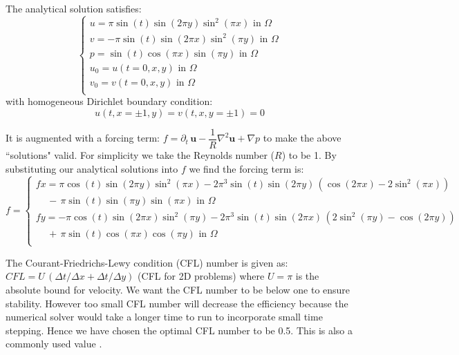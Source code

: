 The analytical solution satisfies:
\begin{equation}
\begin{cases}
u = \pi\sin(t)\sin(2\pi y)\sin^2(\pi x) \text{   in $\Omega$} \\
v = - \pi \sin(t)\sin(2\pi x)\sin^2(\pi y) \text{   in $\Omega$} \\
p = \sin(t)\cos(\pi x)\sin(\pi y)  \text{   in $\Omega$}  \\
u_0 = u(t=0,x,y)  \text{   in $\Omega$}  \\
v_0 = v(t=0,x,y)  \text{   in $\Omega$}  \\
\end{cases}
\end{equation}
with homogeneous Dirichlet boundary condition:
\begin{equation*}
u(t, x=\pm 1, y) = v(t, x,y= \pm 1) = 0
\end{equation*}

It is augmented with a forcing term: $f = \partial_t\,\textbf{u} - \dfrac{1}{R}\nabla^2 \textbf{u} + \nabla p$ to make the above ``solutions" valid. For simplicity we take the Reynolds number ($R$) to be 1. By substituting our analytical solutions into $f$ we find the forcing term is:
\begin{equation}
f = 
\begin{cases}
fx = \pi\cos(t)\sin(2\pi y)\sin^2(\pi x) -  2 \pi^3\sin(t)\sin(2\pi y)\,(\cos(2\pi x) - 2\sin^2(\pi x)) \\
\,\,\,\,\,\,\,- \, \pi\sin(t)\sin(\pi y)\sin(\pi x) \text{   in $\Omega$} \\
fy = - \pi\cos(t)\sin(2\pi x)\sin^2(\pi y) - 2\pi^3\sin(t)\sin(2\pi x)\,(2\sin^2(\pi y) - \cos(2\pi y)) \\
\,\,\,\,\,\,\,+ \, \pi\sin(t)\cos(\pi x)\cos(\pi y)  \text{   in $\Omega$}  \\
\end{cases}
\end{equation}

The Courant-Friedrichs-Lewy condition (CFL) number is given as: $CFL = U\,(\Delta t/\Delta x + \Delta t/\Delta y)$ (CFL for 2D problems) where $U = \pi$ is the absolute bound for velocity. We want the CFL number to be below one to ensure stability. However too small CFL number will decrease the efficiency because the numerical solver would take a longer time to run to incorporate small time stepping. Hence we have chosen the optimal CFL number to be 0.5. This is also a commonly used value \cite{brown2001accurate}.


